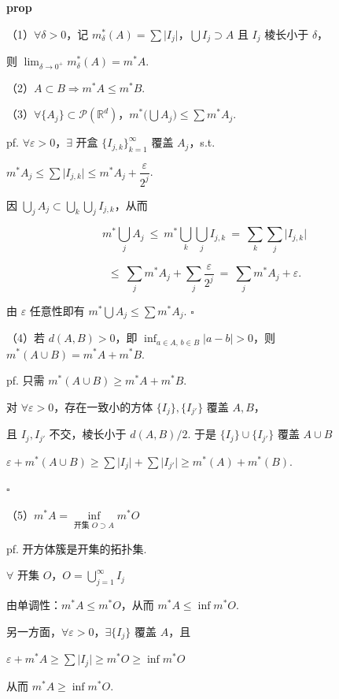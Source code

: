 \documentclass[11pt]{ctexart}
\theoremstyle{definition}
\begin{document}
\textbf{prop}

（1）$\forall \delta > 0$，记 $m_\delta^*(A) = \sum \vert I_j\vert$，$\bigcup I_j \supset A$ 且 $I_j$ 棱长小于 $\delta$，

则 $\lim_{\delta \to 0^+} m_\delta^*(A) = m^*A$.

（2）$A \subset B \Rightarrow m^*A \leq m^*B$.

（3）$\forall \{A_j\} \subset \mathcal{P}(\mathbb{R}^d)$，$m^*\big(\bigcup A_j\big) \leq \sum m^*A_j$.

pf. $\forall \varepsilon > 0$，$\exists$ 开盒 $\{I_{j,k}\}_{k=1}^{\infty}$ 覆盖 $A_j$，s.t.

$m^*A_j \leq \sum \vert I_{j,k}\vert \leq m^*A_j + \dfrac{\varepsilon}{2^j}$.

因 $\bigcup_j A_j \subset \bigcup_k \bigcup_j I_{j,k}$，从而

\[
m^* \bigcup_j A_j \ \leq\ m^* \bigcup_k \bigcup_j I_{j,k} \ =\ \sum_k \sum_j \vert I_{j,k}\vert
\]

\[
\leq\ \sum_j m^*A_j + \sum_j \frac{\varepsilon}{2^j} \ =\ \sum_j m^*A_j + \varepsilon.
\]

由 $\varepsilon$ 任意性即有 $m^*\bigcup A_j \leq \sum m^*A_j$. $\square$

（4）若 $d(A, B) > 0$，即 $\inf_{a \in A,\, b \in B} \vert a - b\vert > 0$，则 $m^*(A \cup B) = m^*A + m^*B$.

pf. 只需 $m^*(A \cup B) \geq m^*A + m^*B$.

对 $\forall \varepsilon > 0$，存在一致小的方体 $\{I_j\}, \{I_{j'}\}$ 覆盖 $A, B$，

且 $I_j, I_{j'}$ 不交，棱长小于 $d(A, B)/2$. 于是 $\{I_j\} \cup \{I_{j'}\}$ 覆盖 $A \cup B$

$\varepsilon + m^*(A \cup B) \geq \sum \vert I_j\vert + \sum \vert I_{j'}\vert \geq m^*(A) + m^*(B)$.

$\square$

（5）$m^*A = \inf\limits_{\text{开集 } O \supset A} m^*O$

pf. 开方体簇是开集的拓扑集.

$\forall$ 开集 $O$，$O = \bigcup_{j=1}^{\infty} I_j$

由单调性：$m^*A \leq m^*O$，从而 $m^*A \leq \inf m^*O$.

另一方面，$\forall \varepsilon > 0$，$\exists \{I_j\}$ 覆盖 $A$，且

$\varepsilon + m^*A \geq \sum \vert I_j\vert \geq m^*O \geq \inf m^*O$

从而 $m^*A \geq \inf m^*O$.
\end{document}
